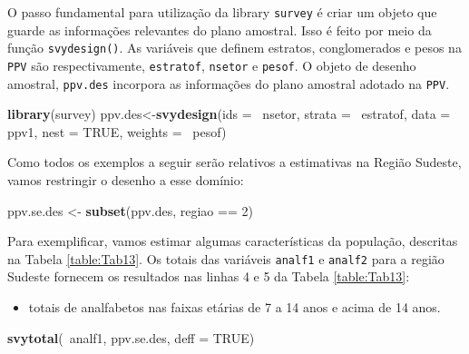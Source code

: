 \documentclass[]{book}
\newenvironment{Shaded}{\begin{snugshade}}{\end{snugshade}}
\newcommand{\KeywordTok}[1]{\textcolor[rgb]{0.13,0.29,0.53}{\textbf{{#1}}}}
\newcommand{\DataTypeTok}[1]{\textcolor[rgb]{0.13,0.29,0.53}{{#1}}}
\newcommand{\DecValTok}[1]{\textcolor[rgb]{0.00,0.00,0.81}{{#1}}}
\newcommand{\StringTok}[1]{\textcolor[rgb]{0.31,0.60,0.02}{{#1}}}
\newcommand{\OtherTok}[1]{\textcolor[rgb]{0.56,0.35,0.01}{{#1}}}
\newcommand{\NormalTok}[1]{{#1}}
\providecommand{\tightlist}{%
  \setlength{\itemsep}{0pt}\setlength{\parskip}{0pt}}
\numberwithin{example}{chapter}
\numberwithin{remark}{chapter}
\numberwithin{definition}{chapter}
\begin{document}
O passo fundamental para utilização da library \texttt{survey}
\citep{R-survey} é criar um objeto que guarde as informações relevantes
do plano amostral. Isso é feito por meio da função \texttt{svydesign()}.
As variáveis que definem estratos, conglomerados e pesos na \texttt{PPV}
são respectivamente, \texttt{estratof}, \texttt{nsetor} e
\texttt{pesof}. O objeto de desenho amostral, \texttt{ppv.des} incorpora
as informações do plano amostral adotado na \texttt{PPV}.

\begin{Shaded}
\begin{Highlighting}[]
\KeywordTok{library}\NormalTok{(survey)}
\NormalTok{ppv.des<-}\KeywordTok{svydesign}\NormalTok{(}\DataTypeTok{ids =} \NormalTok{~nsetor, }\DataTypeTok{strata =} \NormalTok{~estratof,}
\DataTypeTok{data =} \NormalTok{ppv1, }\DataTypeTok{nest =} \OtherTok{TRUE}\NormalTok{, }\DataTypeTok{weights =} \NormalTok{~pesof)}
\end{Highlighting}
\end{Shaded}

Como todos os exemplos a seguir serão relativos a estimativas na Região
Sudeste, vamos restringir o desenho a esse domínio:

\begin{Shaded}
\begin{Highlighting}[]
\NormalTok{ppv.se.des <-}\StringTok{ }\KeywordTok{subset}\NormalTok{(ppv.des, regiao ==}\StringTok{ }\DecValTok{2}\NormalTok{)}
\end{Highlighting}
\end{Shaded}

Para exemplificar, vamos estimar algumas características da população,
descritas na Tabela \ref{table:Tab13}. Os totais das variáveis
\texttt{analf1} e \texttt{analf2} para a região Sudeste fornecem os
resultados nas linhas 4 e 5 da Tabela \ref{table:Tab13}:

\begin{itemize}
\tightlist
\item
  totais de analfabetos nas faixas etárias de 7 a 14 anos e acima de 14
  anos.
\end{itemize}

\begin{Shaded}
\begin{Highlighting}[]
\KeywordTok{svytotal}\NormalTok{(~analf1, ppv.se.des, }\DataTypeTok{deff =} \OtherTok{TRUE}\NormalTok{)}
\end{Highlighting}
\end{Shaded}
\end{document}
